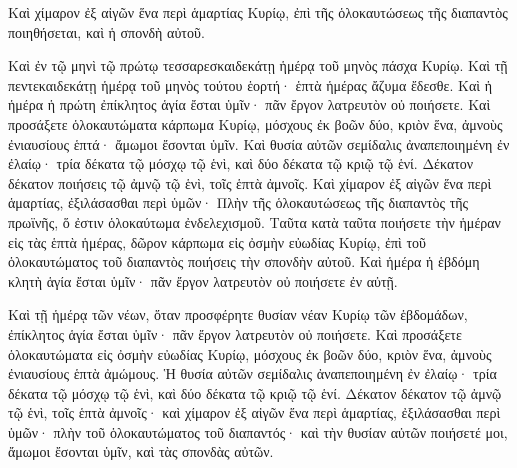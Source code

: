 {\par }{\PP {}Καὶ χίμαρον ἐξ αἰγῶν ἕνα περὶ ἁμαρτίας Κυρίῳ, ἐπὶ τῆς ὁλοκαυτώσεως τῆς διαπαντὸς ποιηθήσεται, καὶ ἡ σπονδὴ αὐτοῦ.
\par }{\PP {}Καὶ ἐν τῷ μηνὶ τῷ πρώτῳ τεσσαρεσκαιδεκάτῃ ἡμέρᾳ τοῦ μηνὸς πάσχα Κυρίῳ.
Καὶ τῇ πεντεκαιδεκάτῃ ἡμέρᾳ τοῦ μηνὸς τούτου ἑορτή· ἑπτὰ ἡμέρας ἄζυμα ἔδεσθε.
Καὶ ἡ ἡμέρα ἡ πρώτη ἐπίκλητος ἁγία ἔσται ὑμῖν· πᾶν ἔργον λατρευτὸν οὐ ποιήσετε.
Καὶ προσάξετε ὁλοκαυτώματα κάρπωμα Κυρίῳ, μόσχους ἐκ βοῶν δύο, κριὸν ἕνα, ἀμνοὺς ἐνιαυσίους ἑπτά· ἄμωμοι ἔσονται ὑμῖν.
Καὶ θυσία αὐτῶν σεμίδαλις ἀναπεποιημένη ἐν ἐλαίῳ· τρία δέκατα τῷ μόσχῳ τῷ ἑνὶ, καὶ δύο δέκατα τῷ κριῷ τῷ ἑνί.
Δέκατον δέκατον ποιήσεις τῷ ἀμνῷ τῷ ἑνὶ, τοῖς ἑπτὰ ἀμνοῖς.
Καὶ χίμαρον ἐξ αἰγῶν ἕνα περὶ ἁμαρτίας, ἐξιλάσασθαι περὶ ὑμῶν·
Πλὴν τῆς ὁλοκαυτώσεως τῆς διαπαντὸς τῆς πρωϊνῆς, ὅ ἐστιν ὁλοκαύτωμα ἐνδελεχισμοῦ.
Ταῦτα κατὰ ταῦτα ποιήσετε τὴν ἡμέραν εἰς τὰς ἑπτὰ ἡμέρας, δῶρον κάρπωμα εἰς ὀσμὴν εὐωδίας Κυρίῳ, ἐπὶ τοῦ ὁλοκαυτώματος τοῦ διαπαντὸς ποιήσεις τὴν σπονδὴν αὐτοῦ.
Καὶ ἡμέρα ἡ ἑβδόμη κλητὴ ἁγία ἔσται ὑμῖν· πᾶν ἔργον λατρευτὸν οὐ ποιήσετε ἐν αὐτῇ.
\par }{\PP {}Καὶ τῇ ἡμέρᾳ τῶν νέων, ὅταν προσφέρητε θυσίαν νέαν Κυρίῳ τῶν ἑβδομάδων, ἐπίκλητος ἁγία ἔσται ὑμῖν· πᾶν ἔργον λατρευτὸν οὐ ποιήσετε.
Καὶ προσάξετε ὁλοκαυτώματα εἰς ὀσμὴν εὐωδίας Κυρίῳ, μόσχους ἐκ βοῶν δύο, κριὸν ἕνα, ἀμνοὺς ἐνιαυσίους ἑπτὰ ἀμώμους.
Ἡ θυσία αὐτῶν σεμίδαλις ἀναπεποιημένη ἐν ἐλαίῳ· τρία δέκατα τῷ μόσχῳ τῷ ἑνὶ, καὶ δύο δέκατα τῷ κριῷ τῷ ἑνί.
Δέκατον δέκατον τῷ ἀμνῷ τῷ ἑνὶ, τοῖς ἑπτὰ ἀμνοῖς·
καὶ χίμαρον ἐξ αἰγῶν ἕνα περὶ ἁμαρτίας, ἐξιλάσασθαι περὶ ὑμῶν· πλὴν τοῦ ὁλοκαυτώματος τοῦ διαπαντός·
καὶ τὴν θυσίαν αὐτῶν ποιήσετέ μοι, ἄμωμοι ἔσονται ὑμῖν, καὶ τὰς σπονδὰς αὐτῶν.

}
